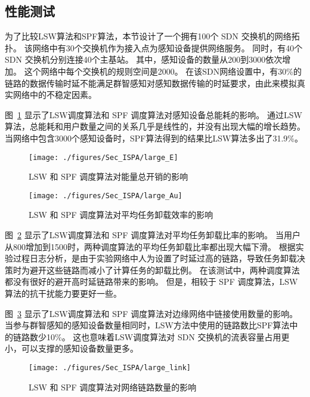 \subsection{性能测试}

为了比较LSW算法和SPF算法，本节设计了一个拥有100个 SDN 交换机的网络拓扑。
该网络中有30个交换机作为接入点为感知设备提供网络服务。
同时，有40个 SDN 交换机分别连接40个主基站。
其中，感知设备的数量从200到3000依次增加。
这个网络中每个交换机的规则空间是2000。
在该SDN网络设置中，有30\%的链路的数据传输时延不能满足群智感知对感知数据传输的时延要求，由此来模拟真实网络中的不稳定因素。

图~\ref{fig_largeE} 显示了LSW调度算法和 SPF 调度算法对感知设备总能耗的影响。
通过LSW算法，总能耗和用户数量之间的关系几乎是线性的，并没有出现大幅的增长趋势。
当网络中包含3000个感知设备时，SPF算法得到的结果比LSW算法多出了31.9\%。

\begin{figure}[!h]
  \centering
  \texttt{[image: ./figures/Sec\_ISPA/large\_E]}
  \vspace{-0.5em}
  \caption{ LSW 和 SPF 调度算法对能量总开销的影响}
  \label{fig_largeE}
  \vspace{-1em}
\end{figure}

\begin{figure}[!b]
  \centering
  \texttt{[image: ./figures/Sec\_ISPA/large\_Au]}
  \vspace{-0.5em}
  \caption{LSW 和 SPF 调度算法对平均任务卸载效率的影响}
  \vspace{-1em}
  \label{fig_largeAu}
\end{figure}

图~\ref{fig_largeAu} 显示了LSW调度算法和 SPF 调度算法对平均任务卸载比率的影响。
当用户从800增加到1500时，两种调度算法的平均任务卸载比率都出现大幅下滑。
根据实验过程日志分析，是由于实验网络中人为设置了时延过高的链路，导致任务卸载决策时为避开这些链路而减小了计算任务的卸载比例。
在该测试中，两种调度算法都没有很好的避开高时延链路带来的影响。
但是，相较于 SPF 调度算法，LSW算法的抗干扰能力要更好一些。

图~\ref{fig_largeL} 显示了LSW调度算法和 SPF 调度算法对边缘网络中链接使用数量的影响。当参与群智感知的感知设备数量相同时，LSW方法中使用的链路数比SPF算法中的链路数少10\%。
这也意味着LSW调度算法对 SDN 交换机的流表容量占用更小，可以支撑的感知设备数量更多。

\begin{figure}[!h]
  \centering
  \texttt{[image: ./figures/Sec\_ISPA/large\_link]}
  \vspace{-0.5em}
  \caption{LSW 和 SPF 调度算法对网络链路数量的影响}
  \vspace{-1em}
  \label{fig_largeL}
\end{figure}


